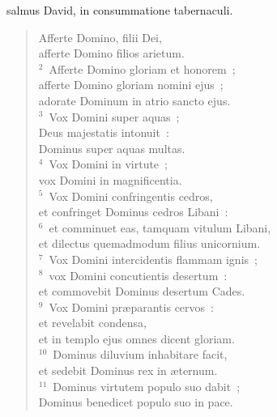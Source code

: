 \bchapter
{}salmus David, in consummatione tabernaculi. \begin{flushleft}\begin{verse}\vspace{6pt}Afferte Domino, filii Dei,\\ afferte Domino filios arietum.\\
${}^{2}$~Afferte Domino gloriam et honorem~;\\ afferte Domino gloriam nomini ejus~;\\ adorate Dominum in atrio sancto ejus.\\
${}^{3}$~Vox Domini super aquas~;\\ Deus majestatis intonuit~:\\ Dominus super aquas multas.\\
${}^{4}$~Vox Domini in virtute~;\\ vox Domini in magnificentia.\\
${}^{5}$~Vox Domini confringentis cedros,\\ et confringet Dominus cedros Libani~:\\
${}^{6}$~et comminuet eas, tamquam vitulum Libani,\\ et dilectus quemadmodum filius unicornium.\\
${}^{7}$~Vox Domini intercidentis flammam ignis~;\\
${}^{8}$~vox Domini concutientis desertum~:\\ et commovebit Dominus desertum Cades.\\
${}^{9}$~Vox Domini pr\ae parantis cervos~:\\ et revelabit condensa,\\ et in templo ejus omnes dicent gloriam.\\
${}^{10}$~Dominus diluvium inhabitare facit,\\ et sedebit Dominus rex in \ae ternum.\\
${}^{11}$~Dominus virtutem populo suo dabit~;\\ Dominus benedicet populo suo in pace.\end{verse}\end{flushleft}



